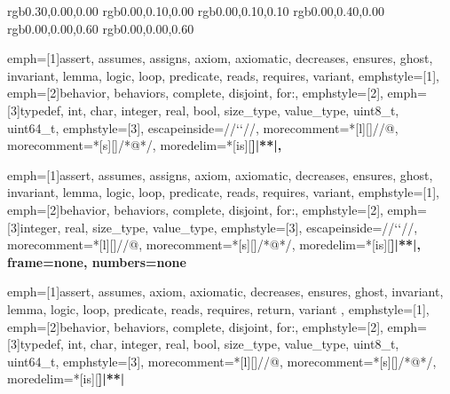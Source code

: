 
\usepackage{courier} 
\usepackage{listings}
\usepackage{color} 


\definecolor{coACSLBehavior}	{rgb}{0.30,0.00,0.00}
\definecolor{coASCL}		{rgb}{0.00,0.10,0.00}
\definecolor{coASCLKeyword}	{rgb}{0.00,0.10,0.10}
\definecolor{darkgreen}		{rgb}{0.00,0.40,0.00}
\definecolor{darkblue}		{rgb}{0.00,0.00,0.60}
\definecolor{coCKeyword}	{rgb}{0.00,0.00,0.60}

{	emph=[1]{assert, assumes, assigns, axiom, axiomatic, decreases, ensures,
                 ghost, invariant, lemma, logic, loop, predicate,
		 reads, requires, variant},
	emphstyle=[1]{\bfseries\color{coASCLKeyword}},
	emph=[2]{behavior, behaviors, complete, disjoint, for:},
	emphstyle=[2]{\bfseries\color{coACSLBehavior}},
	emph=[3]{typedef, int, char, integer, real, bool, size_type, value_type, uint8_t,  uint64_t},
	emphstyle=[3]{\bfseries\color{coCKeyword}},
	escapeinside={//`}{`//},
	morecomment=*[l][\color{coASCL}]{//@},
	morecomment=*[s][\color{coASCL}]{/*@}{*/},
	moredelim=*[is][\bfseries]{|*}{*|},
	}

{	emph=[1]{assert, assumes, assigns, axiom, axiomatic, decreases, ensures,
                 ghost, invariant, lemma, logic, loop, predicate,
		 reads, requires, variant},
	emphstyle=[1]{\bfseries\color{coASCLKeyword}},
	emph=[2]{behavior, behaviors, complete, disjoint, for:},
	emphstyle=[2]{\bfseries\color{coACSLBehavior}},
	emph=[3]{integer, real, size_type, value_type},
	emphstyle=[3]{\bfseries\color{coCKeyword}},
	escapeinside={//`}{`//},
	morecomment=*[l][\color{coASCL}]{//@},
	morecomment=*[s][\color{coASCL}]{/*@}{*/},
	moredelim=*[is][\bfseries]{|*}{*|},
    frame=none,
    numbers=none
	}

{	emph=[1]{assert, assumes, axiom, axiomatic, decreases, ensures, ghost, invariant, lemma, logic, loop,
             predicate, reads, requires, return, variant },
	emphstyle=[1]{\bfseries\color{coASCLKeyword}},
	emph=[2]{behavior, behaviors, complete, disjoint, for:},
	emphstyle=[2]{\bfseries\color{coACSLBehavior}},
	emph=[3]{typedef, int, char, integer, real, bool, size_type, value_type, uint8_t,  uint64_t},
	emphstyle=[3]{\bfseries\color{coCKeyword}},
	morecomment=*[l][\color{coASCL}]{//@},
	morecomment=*[s][\color{coASCL}]{/*@}{*/},
	moredelim=*[is][\bfseries]{|*}{*|}
}

